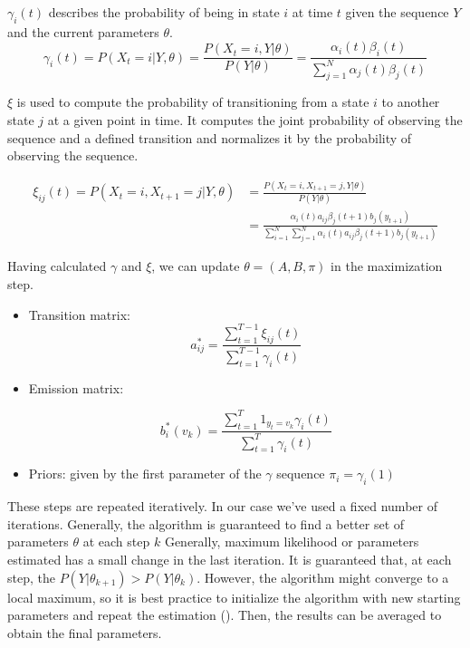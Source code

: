 \documentclass[12pt, authoryear]{elsarticle}
\begin{document}
$\gamma_i(t)$ describes the probability of being in state $i$ at time $t$ given the sequence $Y$ and the current parameters $\theta$. 
 $$ 
 \gamma_{i}(t)=P\left(X_{t}=i | Y, \theta\right)=\frac{P\left(X_{t}=i, Y | \theta \right)}{P(Y | \theta)}=\frac{\alpha_{i}(t) \beta_{i}(t)}{\sum_{j=1}^{N} \alpha_{j}(t) \beta_{j}(t)}
 $$
 
$\xi$ is used to compute the probability of transitioning from a state $i$ to another state $j$ at a given point in time. It computes the joint probability of observing the sequence and a defined transition and normalizes it by the probability of observing the sequence.
 
\begin{align*}
 \xi_{i j}(t) =P\left(X_{t}=i, X_{t+1}=j | Y, \theta \right) &=\frac{P\left(X_{t}=i, X_{t+1}=j, Y | \theta\right)}{P(Y | \theta)} \\
 &=\frac{\alpha_{i}(t) a_{i j} \beta_{j}(t+1) b_{j}\left(y_{t+1}\right)}{\sum_{i=1}^{N} \sum_{j=1}^{N} \alpha_{i}(t) a_{i j} \beta_{j}(t+1) b_{j}\left(y_{t+1}\right)}
\end{align*} 
 
Having calculated $\gamma$ and $\xi$, we can update $\theta = (A,B,\pi)$ in the maximization step.

\begin{itemize}
 	\item Transition matrix: $$ 
 	a_{i j}^{*}=\frac{\sum_{t=1}^{T-1} \xi_{i j}(t)}{\sum_{t=1}^{T-1} \gamma_{i}(t)}
 	$$
 	
 	\item Emission matrix: 
 	
 	$$ 
 	b_{i}^{*}\left(v_{k}\right)=\frac{\sum_{t=1}^{T} 1_{y_{t}=v_{k}} \gamma_{i}(t)}{\sum_{t=1}^{T} \gamma_{i}(t)}
 	$$
 	
 	\item Priors: given by the first parameter of the $\gamma$ sequence $\pi_{i}=\gamma_{i}(1)$
\end{itemize}

These steps are repeated iteratively. In our case we've used a fixed number of iterations. Generally, the algorithm is guaranteed to find a better set of parameters $\theta$ at each step $k$ Generally, maximum likelihood or parameters estimated has a small change in the last iteration. It is guaranteed that, at each step, the $P(Y|\theta_{k+1})>P(Y|\theta_{k})$. However, the algorithm might converge to a local maximum, so it is best practice to initialize the algorithm with new starting parameters and repeat the estimation (\cite{rabiner1989tutorial}). Then, the results can be averaged to obtain the final parameters. 
\end{document}
